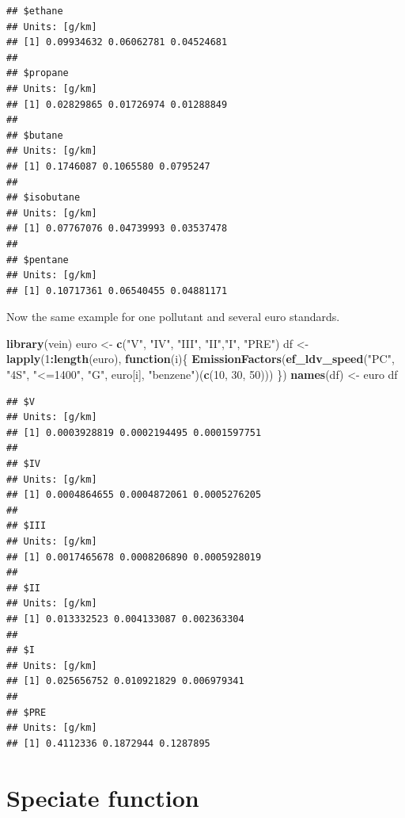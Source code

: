 \documentclass[12pt,graybox,envcountchap,sectrefs]{krantz}
\makeatletter
\newenvironment{Shaded}{\begin{snugshade}}{\end{snugshade}}
\newcommand{\KeywordTok}[1]{\textcolor[rgb]{0.13,0.29,0.53}{\textbf{#1}}}
\newcommand{\DecValTok}[1]{\textcolor[rgb]{0.00,0.00,0.81}{#1}}
\newcommand{\StringTok}[1]{\textcolor[rgb]{0.31,0.60,0.02}{#1}}
\newcommand{\ControlFlowTok}[1]{\textcolor[rgb]{0.13,0.29,0.53}{\textbf{#1}}}
\newcommand{\OperatorTok}[1]{\textcolor[rgb]{0.81,0.36,0.00}{\textbf{#1}}}
\newcommand{\NormalTok}[1]{#1}
\newenvironment{kframe}{%
\medskip{}
\setlength{\fboxsep}{.8em}
 \def\at@end@of@kframe{}%
 \ifinner\ifhmode%
  \def\at@end@of@kframe{\end{minipage}}%
  \begin{minipage}{\columnwidth}%
 \fi\fi%
 \def\FrameCommand##1{\hskip\@totalleftmargin \hskip-\fboxsep
 \colorbox{shadecolor}{##1}\hskip-\fboxsep
     \hskip-\linewidth \hskip-\@totalleftmargin \hskip\columnwidth}%
 \MakeFramed {\advance\hsize-\width
   \@totalleftmargin\z@ \linewidth\hsize
   \@setminipage}}%
 {\par\unskip\endMakeFramed%
 \at@end@of@kframe}
\renewenvironment{Shaded}{\begin{kframe}}{\end{kframe}}
\theoremstyle{definition}
\theoremstyle{definition}
\theoremstyle{definition}
\theoremstyle{remark}
\makeatother
\begin{document}
\begin{verbatim}
## $ethane
## Units: [g/km]
## [1] 0.09934632 0.06062781 0.04524681
## 
## $propane
## Units: [g/km]
## [1] 0.02829865 0.01726974 0.01288849
## 
## $butane
## Units: [g/km]
## [1] 0.1746087 0.1065580 0.0795247
## 
## $isobutane
## Units: [g/km]
## [1] 0.07767076 0.04739993 0.03537478
## 
## $pentane
## Units: [g/km]
## [1] 0.10717361 0.06540455 0.04881171
\end{verbatim}

Now the same example for one pollutant and several euro standards.

\begin{Shaded}
\begin{Highlighting}[]
\KeywordTok{library}\NormalTok{(vein)}
\NormalTok{euro <-}\StringTok{ }\KeywordTok{c}\NormalTok{(}\StringTok{"V"}\NormalTok{, }\StringTok{"IV"}\NormalTok{, }\StringTok{"III"}\NormalTok{, }\StringTok{"II"}\NormalTok{,}\StringTok{"I"}\NormalTok{, }\StringTok{"PRE"}\NormalTok{)}
\NormalTok{df <-}\StringTok{ }\KeywordTok{lapply}\NormalTok{(}\DecValTok{1}\OperatorTok{:}\KeywordTok{length}\NormalTok{(euro), }\ControlFlowTok{function}\NormalTok{(i)\{}
  \KeywordTok{EmissionFactors}\NormalTok{(}\KeywordTok{ef_ldv_speed}\NormalTok{(}\StringTok{"PC"}\NormalTok{, }\StringTok{"4S"}\NormalTok{, }\StringTok{"<=1400"}\NormalTok{, }\StringTok{"G"}\NormalTok{, euro[i],}
                               \StringTok{"benzene"}\NormalTok{)(}\KeywordTok{c}\NormalTok{(}\DecValTok{10}\NormalTok{, }\DecValTok{30}\NormalTok{, }\DecValTok{50}\NormalTok{)))}
\NormalTok{\})}
\KeywordTok{names}\NormalTok{(df) <-}\StringTok{ }\NormalTok{euro}
\NormalTok{df}
\end{Highlighting}
\end{Shaded}

\begin{verbatim}
## $V
## Units: [g/km]
## [1] 0.0003928819 0.0002194495 0.0001597751
## 
## $IV
## Units: [g/km]
## [1] 0.0004864655 0.0004872061 0.0005276205
## 
## $III
## Units: [g/km]
## [1] 0.0017465678 0.0008206890 0.0005928019
## 
## $II
## Units: [g/km]
## [1] 0.013332523 0.004133087 0.002363304
## 
## $I
## Units: [g/km]
## [1] 0.025656752 0.010921829 0.006979341
## 
## $PRE
## Units: [g/km]
## [1] 0.4112336 0.1872944 0.1287895
\end{verbatim}

\section{Speciate function}\label{speciate-function}
\end{document}
